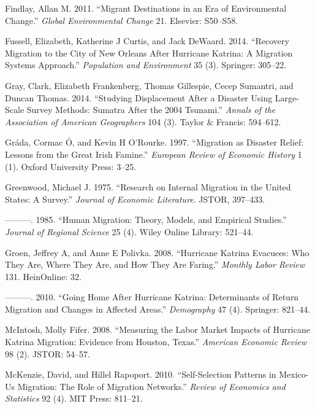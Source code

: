 \documentclass[]{article}
\begin{document}
\hypertarget{ref-findlay2011migrant}{}
Findlay, Allan M. 2011. ``Migrant Destinations in an Era of
Environmental Change.'' \emph{Global Environmental Change} 21. Elsevier:
S50--S58.

\hypertarget{ref-fussell2014recovery}{}
Fussell, Elizabeth, Katherine J Curtis, and Jack DeWaard. 2014.
``Recovery Migration to the City of New Orleans After Hurricane Katrina:
A Migration Systems Approach.'' \emph{Population and Environment} 35
(3). Springer: 305--22.

\hypertarget{ref-gray2014studying}{}
Gray, Clark, Elizabeth Frankenberg, Thomas Gillespie, Cecep Sumantri,
and Duncan Thomas. 2014. ``Studying Displacement After a Disaster Using
Large-Scale Survey Methods: Sumatra After the 2004 Tsunami.''
\emph{Annals of the Association of American Geographers} 104 (3). Taylor
\& Francis: 594--612.

\hypertarget{ref-grada1997migration}{}
Gráda, Cormac Ó, and Kevin H O'Rourke. 1997. ``Migration as Disaster
Relief: Lessons from the Great Irish Famine.'' \emph{European Review of
Economic History} 1 (1). Oxford University Press: 3--25.

\hypertarget{ref-greenwood1975research}{}
Greenwood, Michael J. 1975. ``Research on Internal Migration in the
United States: A Survey.'' \emph{Journal of Economic Literature}. JSTOR,
397--433.

\hypertarget{ref-greenwood1985human}{}
---------. 1985. ``Human Migration: Theory, Models, and Empirical
Studies.'' \emph{Journal of Regional Science} 25 (4). Wiley Online
Library: 521--44.

\hypertarget{ref-groen2008hurricane}{}
Groen, Jeffrey A, and Anne E Polivka. 2008. ``Hurricane Katrina
Evacuees: Who They Are, Where They Are, and How They Are Faring.''
\emph{Monthly Labor Review} 131. HeinOnline: 32.

\hypertarget{ref-groen2010going}{}
---------. 2010. ``Going Home After Hurricane Katrina: Determinants of
Return Migration and Changes in Affected Areas.'' \emph{Demography} 47
(4). Springer: 821--44.

\hypertarget{ref-mcintosh2008measuring}{}
McIntosh, Molly Fifer. 2008. ``Measuring the Labor Market Impacts of
Hurricane Katrina Migration: Evidence from Houston, Texas.''
\emph{American Economic Review} 98 (2). JSTOR: 54--57.

\hypertarget{ref-mckenzie2010self}{}
McKenzie, David, and Hillel Rapoport. 2010. ``Self-Selection Patterns in
Mexico-Us Migration: The Role of Migration Networks.'' \emph{Review of
Economics and Statistics} 92 (4). MIT Press: 811--21.
\end{document}

